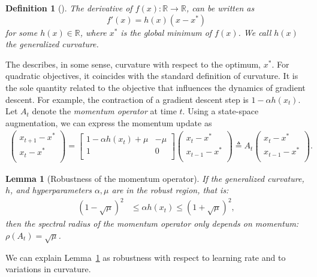 \documentclass{article}
\newtheorem{definition}[theorem]{Definition}
\newtheorem{lemma}[theorem]{Lemma}
\newcommand{\mat}[1]{\bm{\mathit{#1}}}
\begin{document}
\begin{definition}[\Gc]
\label{def:generalized_curvature}
The derivative of $f(x):\mathbb{R}\rightarrow\mathbb{R}$, can be written as 
\begin{equation}
	 f'(x) = h(x) (x - x^*) 
	\label{eqn:generalized_curvature}
\end{equation}
for some $h(x) \in \mathbb{R}$, where $x^*$ is the global minimum of $f(x)$.
We call $h(x)$ the {\em generalized curvature}.
\end{definition}

The \gc describes, in some sense, curvature with respect to the optimum,  $x^*$.
For quadratic objectives, it coincides with the standard definition of curvature.
It is the sole quantity related to the objective that influences the dynamics of gradient descent.
For example, the contraction of a gradient descent step is $1-\alpha h(x_t)$.
Let $\mat{A}_t$ denote the {\em momentum operator} at time $t$.
Using a state-space augmentation, we can express the momentum update as
\begin{align}
{\begin{pmatrix}
x_{t+1} - x^*\\
x_t - x^* \\
\end{pmatrix}}
=
{\begin{bmatrix}
1-\alpha h(x_t) + \mu & - \mu \\
1 & 0 \\
\end{bmatrix}}
{\begin{pmatrix}
x_t - x^* \\
x_{t-1} - x^*\\
\end{pmatrix}}
\triangleq
\mat{A}_t
{\begin{pmatrix}
x_t - x^* \\
x_{t-1} - x^*\\
\end{pmatrix}}.
\label{equ:one_dim_22_rec}
\end{align}

\begin{lemma}[Robustness of the momentum operator]
\label{lem:robustness}
If the generalized curvature, $h$, and hyperparameters $\alpha,\mu$ are in the {\em robust region}, that is: 
\begin{align}
{(1-\sqrt{\mu})^2} &\leq \alpha h(x_t) \leq {(1+\sqrt{\mu})^2},
\label{eqn:robust_region}
\end{align}
then the spectral radius of the momentum operator only depends on  momentum: $	\rho(\mat{A}_t) = \sqrt{\mu}
$. 
\end{lemma}
We can explain Lemma~\ref{lem:robustness} as robustness with respect to learning rate and to variations in curvature.
\end{document}
